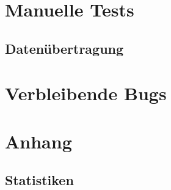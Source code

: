 \documentclass[a4paper]{scrreprt}
\begin{document}
\chapter{Manuelle Tests}
\section{Datenübertragung}
\chapter{Verbleibende Bugs}
\chapter{Anhang}
\section{Statistiken}

\printnoidxglossaries

\listoffigures
 
\end{document}
